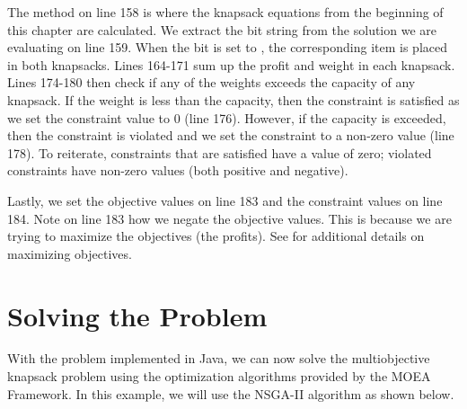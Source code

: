 The  method on line 158 is where the knapsack equations from the beginning of this chapter are calculated.  We extract the bit string from the solution we are evaluating on line 159.  When the bit is set to , the corresponding item is placed in both knapsacks.  Lines 164-171 sum up the profit and weight in each knapsack.  Lines 174-180 then check if any of the weights exceeds the capacity of any knapsack.  If the weight is less than the capacity, then the constraint is satisfied as we set the constraint value to 0 (line 176).  However, if the capacity is exceeded, then the constraint is violated and we set the constraint to a non-zero value (line 178).  To reiterate, constraints that are satisfied have a value of zero; violated constraints have non-zero values (both positive and negative).

Lastly, we set the objective values on line 183 and the constraint values on line 184.  Note on line 183 how we negate the objective values.  This is because we are trying to maximize the objectives (the profits).  See  for additional details on maximizing objectives.

\section{Solving the Problem}
With the problem implemented in Java, we can now solve the multiobjective knapsack problem using the optimization algorithms provided by the MOEA Framework.  In this example, we will use the NSGA-II algorithm as shown below.  

